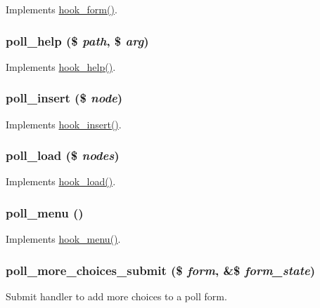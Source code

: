 \label{poll_8module_a32cd2c5b13bfc397270c31e2d26765de}
Implements \hyperlink{group__node__api__hooks_ga52618ef4643a60878dd5a76ff9bbff30}{hook\_\-form()}. \hypertarget{poll_8module_a27ad4deda5a024a714aca172f2f6451d}{
\subsubsection[{poll\_\-help}]{\setlength{\rightskip}{0pt plus 5cm}poll\_\-help (\$ {\em path}, \/  \$ {\em arg})}}
\label{poll_8module_a27ad4deda5a024a714aca172f2f6451d}
Implements \hyperlink{group__hooks_ga5589c2714a782738e8851c4c90231f0e}{hook\_\-help()}. \hypertarget{poll_8module_ad302f1defb634370507bb6e4faf99a77}{
\subsubsection[{poll\_\-insert}]{\setlength{\rightskip}{0pt plus 5cm}poll\_\-insert (\$ {\em node})}}
\label{poll_8module_ad302f1defb634370507bb6e4faf99a77}
Implements \hyperlink{group__node__api__hooks_ga3c6a28d33e07d3506e1eb99718ef4e39}{hook\_\-insert()}. \hypertarget{poll_8module_afe0b2c5187bd16fa04a1ca8133fdd782}{
\subsubsection[{poll\_\-load}]{\setlength{\rightskip}{0pt plus 5cm}poll\_\-load (\$ {\em nodes})}}
\label{poll_8module_afe0b2c5187bd16fa04a1ca8133fdd782}
Implements \hyperlink{group__node__api__hooks_ga49065b040d7fb3e02889eda6361dac34}{hook\_\-load()}. \hypertarget{poll_8module_abd4f2d36dc91b4265472740ca890fa62}{
\subsubsection[{poll\_\-menu}]{\setlength{\rightskip}{0pt plus 5cm}poll\_\-menu ()}}
\label{poll_8module_abd4f2d36dc91b4265472740ca890fa62}
Implements \hyperlink{group__hooks_ga5c95244fea59b25666e409759e133ded}{hook\_\-menu()}. \hypertarget{poll_8module_ae339bb6acfe80a22326439034dd04a4c}{
\subsubsection[{poll\_\-more\_\-choices\_\-submit}]{\setlength{\rightskip}{0pt plus 5cm}poll\_\-more\_\-choices\_\-submit (\$ {\em form}, \/  \&\$ {\em form\_\-state})}}
\label{poll_8module_ae339bb6acfe80a22326439034dd04a4c}
Submit handler to add more choices to a poll form.

